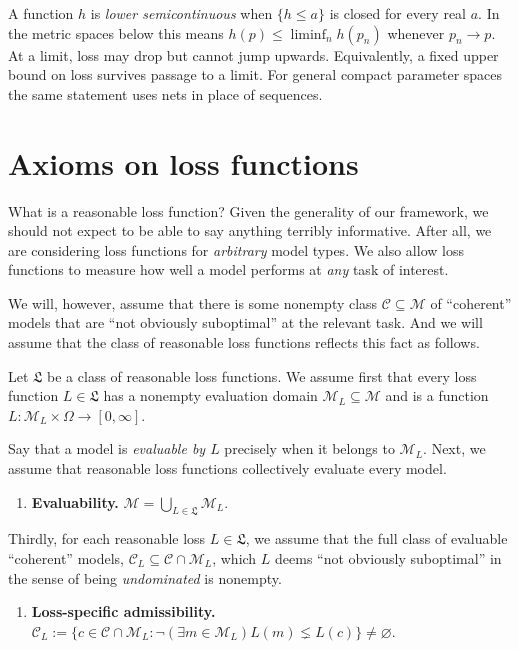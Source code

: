 \documentclass[11pt]{article}
\theoremstyle{definition}
\theoremstyle{remark}
\newcommand{\M}{\mathcal M}
\newcommand{\C}{\mathcal C}
\begin{document}
A function $h$ is \emph{lower semicontinuous} when $\{h\le a\}$ is closed for every real $a$. In the metric spaces below this means $h(p)\le\liminf_n h(p_n)$ whenever $p_n\to p$. At a limit, loss may drop but cannot jump upwards. Equivalently, a fixed upper bound on loss survives passage to a limit. For general compact parameter spaces the same statement uses nets in place of sequences.


\section{Axioms on loss functions}\label{sec:axioms}

What is a reasonable loss function? Given the generality of our framework, we should not expect to be able to say anything terribly informative. After all, we are considering loss functions for \textit{arbitrary} model types. We also allow loss functions to measure how well a model performs at \textit{any} task of interest.


We will, however, assume that there is some nonempty class $\C\subseteq\M$ of ``coherent'' models that are ``not obviously suboptimal'' at the relevant task. And we will assume that the class of reasonable loss functions reflects this fact as follows. 


Let $\mathfrak L$ be a class of reasonable loss functions. We assume first that every loss function $L\in\mathfrak L$ has a nonempty evaluation domain $\M_L\subseteq\M$ and is a function $L:\M_L\times\Omega\to[0,\infty]$. 

Say that a model is \emph{evaluable by $L$} precisely when it belongs to $\M_L$. Next, we assume that reasonable loss functions collectively evaluate every model.
\begin{enumerate}[label=\textbf{(E)},leftmargin=*]
\item \textbf{Evaluability.} $\M=\bigcup_{L\in\mathfrak L}\M_L$.
\end{enumerate}

Thirdly, for each reasonable loss $L\in\mathfrak L$, we assume that the full class of evaluable ``coherent'' models, $\C_L\subseteq\C\cap\M_L$, which $L$ deems ``not obviously suboptimal'' in the sense of being \textit{undominated} is nonempty. 

\begin{enumerate}[label=\textbf{(LA)},leftmargin=*]
\item \textbf{Loss-specific admissibility.} $\C_L:=\{c\in\C\cap\M_L : \neg(\exists m\in\M_L)L(m)\lneq L(c)\}\neq\varnothing$.
\end{enumerate}
\end{document}
